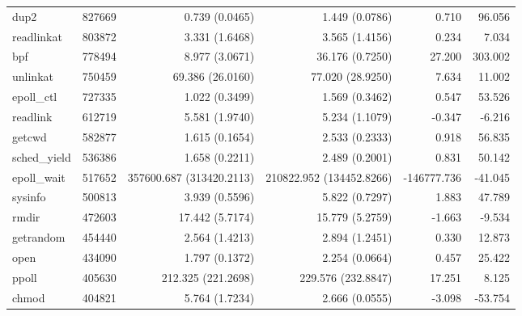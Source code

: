 \begin{longtable}{>{\ttfamily}lrrrrr}
                           dup2 &     827669 &              0.739 (0.0465) &            1.449 (0.0786) &           0.710 &       96.056 \\
                     readlinkat &     803872 &              3.331 (1.6468) &            3.565 (1.4156) &           0.234 &        7.034 \\
                            bpf &     778494 &              8.977 (3.0671) &           36.176 (0.7250) &          27.200 &      303.002 \\
                       unlinkat &     750459 &            69.386 (26.0160) &          77.020 (28.9250) &           7.634 &       11.002 \\
                     epoll\_ctl &     727335 &              1.022 (0.3499) &            1.569 (0.3462) &           0.547 &       53.526 \\
                       readlink &     612719 &              5.581 (1.9740) &            5.234 (1.1079) &          -0.347 &       -6.216 \\
                         getcwd &     582877 &              1.615 (0.1654) &            2.533 (0.2333) &           0.918 &       56.835 \\
                   sched\_yield &     536386 &              1.658 (0.2211) &            2.489 (0.2001) &           0.831 &       50.142 \\
                    epoll\_wait &     517652 &    357600.687 (313420.2113) &  210822.952 (134452.8266) &     -146777.736 &      -41.045 \\
                        sysinfo &     500813 &              3.939 (0.5596) &            5.822 (0.7297) &           1.883 &       47.789 \\
                          rmdir &     472603 &             17.442 (5.7174) &           15.779 (5.2759) &          -1.663 &       -9.534 \\
                      getrandom &     454440 &              2.564 (1.4213) &            2.894 (1.2451) &           0.330 &       12.873 \\
                           open &     434090 &              1.797 (0.1372) &            2.254 (0.0664) &           0.457 &       25.422 \\
                          ppoll &     405630 &          212.325 (221.2698) &        229.576 (232.8847) &          17.251 &        8.125 \\
                          chmod &     404821 &              5.764 (1.7234) &            2.666 (0.0555) &          -3.098 &      -53.754 \\

\end{longtable}
